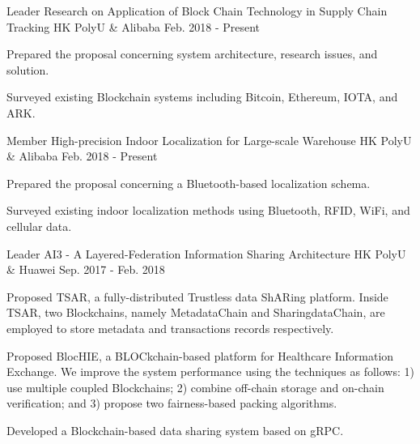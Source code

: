 \documentclass[11pt, a4paper]{awesome-cv} %
\begin{document}
\newpage

\begin{cventries}
\cventry
{Leader} %
{Research on Application of Block Chain Technology in Supply Chain Tracking} %
{HK PolyU \& Alibaba} %
{Feb. 2018 - Present} %
{ %
\begin{cvitems}
\item {Prepared the proposal concerning system architecture, research issues, and solution.}
\item {Surveyed existing Blockchain systems including Bitcoin, Ethereum, IOTA, and ARK.}
\end{cvitems}
}

\cventry
{Member} %
{High-precision Indoor Localization for Large-scale Warehouse} %
{HK PolyU \& Alibaba} %
{Feb. 2018 - Present} %
{ %
\begin{cvitems}
\item {Prepared the proposal concerning a Bluetooth-based localization schema.}
\item {Surveyed existing indoor localization methods using Bluetooth, RFID, WiFi, and cellular data.}
\end{cvitems}
}

\cventry
{Leader} %
{AI3 - A Layered-Federation Information Sharing Architecture} %
{HK PolyU \& Huawei} %
{Sep. 2017 - Feb. 2018} %
{ %
\begin{cvitems}
\item {Proposed TSAR, a fully-distributed Trustless data ShARing platform. Inside TSAR, two Blockchains, namely MetadataChain and SharingdataChain, are employed to store metadata and transactions records respectively.}
\item {Proposed BlocHIE, a BLOCkchain-based platform for Healthcare Information Exchange. We improve the system performance using the techniques as follows: 1) use multiple coupled Blockchains; 2) combine off-chain storage and on-chain verification; and 3) propose two fairness-based packing algorithms.}
\item {Developed a Blockchain-based data sharing system based on gRPC.}
\end{cvitems}
}


\end{cventries}
\end{document}
